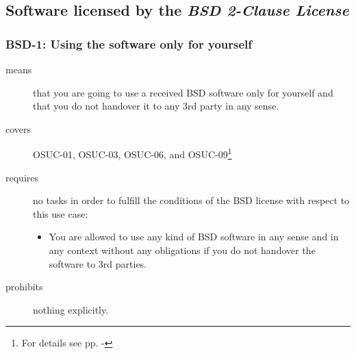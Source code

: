 \begin{center}
\begin{footnotesize}
{{{{{{           
        }


      }
 
    }
   }   

  }
}
\end{footnotesize}
\end{center}

\subsection{Software licensed by the \emph{BSD 2-Clause License}}

\subsubsection{BSD-1: Using the software only for yourself}
\label{OSUC-01-BSD} 
\label{OSUC-03-BSD} 
\label{OSUC-06-BSD}
\label{OSUC-09-BSD}
  
\begin{description}
\item[means] that you are going to use a received BSD software only for yourself
and that you do not handover it to any 3rd party in any sense.
\item[covers] OSUC-01, OSUC-03, OSUC-06, and OSUC-09\footnote{For details see pp.
  \pageref{OSUC-01-DEF} - \pageref{OSUC-09-DEF}}
\item[requires] no tasks in order to fulfill the conditions of the BSD license
with respect to this use case:
  \begin{itemize}
    \item You are allowed to use any kind of BSD software in any sense and in
    any context without any obligations if you do not handover the software to
    3rd parties.
  \end{itemize}
\item[prohibits] nothing explicitly.
\end{description}


